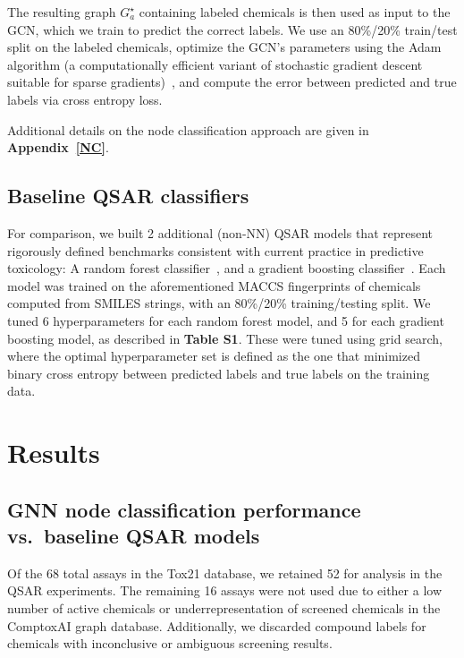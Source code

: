 \documentclass{ws-procs11x85}
\begin{document}
The resulting graph $G_a^\star$ containing labeled chemicals is then used as input to the GCN, which we train to predict the correct labels.
We use an 80\%/20\% train/test split on the labeled chemicals, optimize the GCN's parameters using the Adam algorithm (a computationally efficient variant of stochastic gradient descent suitable for sparse gradients)~\cite{kingma2014adam}, and compute the error between predicted and true labels via cross entropy loss.

Additional details on the node classification approach are given in \textbf{Appendix~\ref{NC}}.

\subsection{Baseline QSAR classifiers}
For comparison, we built 2 additional (non-NN) QSAR models that represent rigorously defined benchmarks consistent with current practice in predictive toxicology: A random forest classifier~\cite{svetnik2003random}, and a gradient boosting classifier~\cite{sheridan2016extreme}.
Each model was trained on the aforementioned MACCS fingerprints of chemicals computed from SMILES strings, with an 80\%/20\% training/testing split.
We tuned 6 hyperparameters for each random forest model, and 5 for each gradient boosting model, as described in \textbf{Table S1}.
These were tuned using grid search, where the optimal hyperparameter set is defined as the one that minimized binary cross entropy between predicted labels and true labels on the training data.

\section{Results}
\subsection{GNN node classification performance vs.\ baseline QSAR models}
Of the 68 total assays in the Tox21 database, we retained 52 for analysis in the QSAR experiments.
The remaining 16 assays were not used due to either a low number of active chemicals or underrepresentation of screened chemicals in the ComptoxAI graph database.
Additionally, we discarded compound labels for chemicals with inconclusive or ambiguous screening results.
\end{document}
